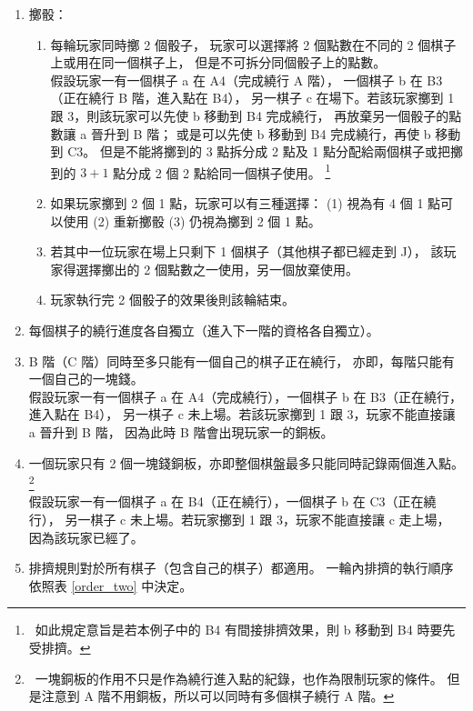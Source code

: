 \documentclass[11pt,a4paper]{article}
\begin{document}
\begin{enumerate}
\begin{enumerate}
				點數 2 朝上的棋子可以在 B 階中任意方向移動；
				點數 3 朝上的棋子可以在 C 階中任意方向移動。\\
				\zB 若有一數 1 朝上的棋子位在 A15 且玩家骰到其中一個點數為 1，
				則該棋子得移動到 A14 或 A16。
			\item \label{ok}
				\textsf{擲骰}：
				\begin{enumerate}
					\item
						每輪玩家同時擲 2 個骰子，
						玩家可以選擇將 2 個點數在不同的 2 個棋子上或用在同一個棋子上，
						但是不可拆分同個骰子上的點數。\\
						\zB 假設玩家一有一個棋子 a 在 A4（完成繞行 A 階），
						一個棋子 b 在 B3（正在繞行 B 階，進入點在 B4），
						另一棋子 c 在場下。若該玩家擲到 1 跟 3，則該玩家可以先使 b 移動到 B4 完成繞行，
						再放棄另一個骰子的點數讓 a 晉升到 B 階；
						或是可以先使 b 移動到 B4 完成繞行，再使 b 移動到 C3。
						但是不能將擲到的 3 點拆分成
						2 點及 1 點分配給兩個棋子或把擲到的 $3+1$ 點分成 2 個 2 點給同一個棋子使用。
							\footnote{\ 如此規定意旨是若本例子中的 B4 有間接排擠效果，則 b 移動到 B4 時要先受排擠。}
					\item
						如果玩家擲到 2 個 1 點，玩家可以有三種選擇：
						(1) 視為有 4 個 1 點可以使用 (2) 重新擲骰 (3) 仍視為擲到 2 個 1 點。
					\item
						若其中一位玩家在場上只剩下 1 個棋子（其他棋子都已經走到 J），
						該玩家得選擇擲出的 2 個點數之一使用，另一個放棄使用。
					\item
						玩家執行完 2 個骰子的效果後則該輪結束。
				\end{enumerate}
			\item
				每個棋子的繞行進度各自獨立（進入下一階的資格各自獨立）。
			\item
				B 階（C 階）同時至多只能有一個自己的棋子正在繞行，
				亦即，每階只能有一個自己的一塊錢。\\
				\zB 假設玩家一有一個棋子 a 在 A4（完成繞行），一個棋子 b 在 B3（正在繞行，進入點在 B4），
				另一棋子 c 未上場。若該玩家擲到 1 跟 3，玩家不能直接讓 a 晉升到 B 階，
				因為此時 B 階會出現玩家一的銅板。
			\item
				一個玩家只有 2 個一塊錢銅板，亦即整個棋盤最多只能同時記錄兩個進入點。
					\footnote{\ 一塊銅板的作用不只是作為繞行進入點的紀錄，也作為限制玩家的條件。
					但是注意到 A 階不用銅板，所以可以同時有多個棋子繞行 A 階。}\\
				\zB 假設玩家一有一個棋子 a 在 B4（正在繞行），一個棋子 b 在 C3（正在繞行），
				另一棋子 c 未上場。若玩家擲到 1 跟 3，玩家不能直接讓 c 走上場，
				因為該玩家已經了。
			\item
				排擠規則對於所有棋子（包含自己的棋子）都適用。
				一輪內排擠的執行順序依照表 \ref{order_two} 中決定。
		\end{enumerate}
\end{enumerate}
\end{document}
